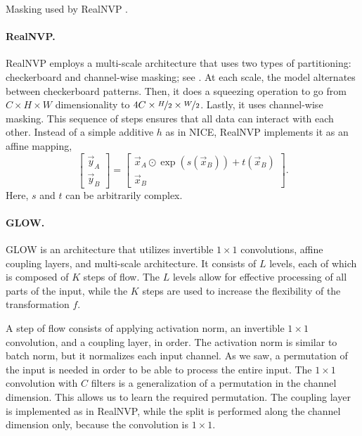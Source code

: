 \begin{marginfigure}
    \centering
    \caption{Masking used by RealNVP \citep{dinh2016density}.}
    \label{fig:nvp-masking}
\end{marginfigure}

\paragraph{RealNVP.} RealNVP \citep{dinh2016density} employs a multi-scale architecture that uses two types of
partitioning: checkerboard and channel-wise masking; see . At each scale, the
model alternates between checkerboard patterns. Then, it does a squeezing operation to go from $C
    \times H \times W$ dimensionality to $4C \times \nicefrac{H}{2} \times \nicefrac{W}{2}$. Lastly, it
uses channel-wise masking. This sequence of steps ensures that all data can interact with each
other. Instead of a simple additive $h$ as in NICE, RealNVP implements it as an affine mapping, \[
    \begin{bmatrix} \vec{y}_A \\ \vec{y}_B \end{bmatrix} = \begin{bmatrix} \vec{x}_A \odot \exp(s(\vec{x}_B)) + t(\vec{x}_B) \\ \vec{x}_B \end{bmatrix}.
\]
Here, $s$ and $t$ can be arbitrarily complex.

\paragraph{GLOW.} GLOW \citep{kingma2018glow} is an architecture that utilizes invertible $1 \times 1$ convolutions,
affine coupling layers, and multi-scale architecture. It consists of $L$ levels, each of which is
composed of $K$ steps of flow. The $L$ levels allow for effective processing of all parts of the
input, while the $K$ steps are used to increase the flexibility of the transformation $f$.

A step of flow consists of applying activation norm, an invertible $1 \times 1$ convolution, and a
coupling layer, in order. The activation norm is similar to batch norm, but it normalizes each
input channel. As we saw, a permutation of the input is needed in order to be able to process the
entire input. The $1 \times 1$ convolution with $C$ filters is a generalization of a permutation in
the channel dimension. This allows us to learn the required permutation. The coupling layer is
implemented as in RealNVP, while the split is performed along the channel dimension only, because
the convolution is $1 \times 1$.
